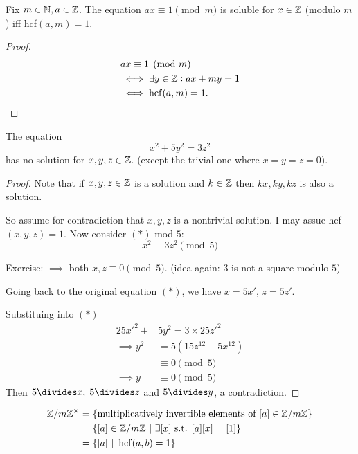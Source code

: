 \documentclass[twoside]{scrartcl}
\DeclareMathOperator{\hcf}{hcf}
\begin{document}
\begin{proposition}
Fix $m \in \mathbb{N}, a \in \mathbb{Z}$. The equation $ax \equiv 1 \pmod{m}$ is soluble for $x \in\mathbb{Z}$ (modulo $m$) iff hcf$(a,m) = 1$. 	
\end{proposition}

\begin{proof}
\[
\begin{aligned}
  &ax \equiv 1 \pmod{m}\\
  &\iff \exists y \iZ: ax +my = 1\\
  &\iff \hcf(a,m) = 1.
\end{aligned}
\]
\end{proof}\vspace*{10pt}

\begin{example}
The equation
\[x^2 + 5y^2 = 3z^2 \tag{$*$}\]	
has no solution for $x,y,z \in\mathbb{Z}$. (except the trivial one where $x = y = z = 0$).

\begin{proof}
Note that if $x,y,z \in\mathbb{Z}$ is a solution and $k\in\mathbb{Z}$ then $kx,ky, kz$ is also a solution. 

So assume for contradiction that $x,y,z$ is a nontrivial solution. I may assue hcf$(x,y,z) = 1$. Now consider $(*)$ mod $5$: 
\[x^2 \equiv 3z^2 \pmod{5}\]

Exercise: $\implies$ both $x,z \equiv 0 \pmod{5}$. (idea again: $3$ is not a square modulo $5$)

Going back to the original equation $(*)$, we have $x = 5x'$, $z = 5z'$. 

Substituing into $(*)$
\[
\begin{aligned}
  25x'^2 +& 5y^2 = 3\times 25 z'^2\\
  \implies y^2 &= 5 (15 z^{12} - 5x^{12})\\
  &\equiv 0 \pmod{5}\\
  \implies y &\equiv0 \pmod{5}
\end{aligned}
\]
Then $5 \divides x,\; 5 \divides z$ and $5\divides y$, a contradiction.
\end{proof}
\end{example}\vspace*{5pt}


\begin{definition} 
\[
\begin{aligned}
  \Z / m\Z^\times &= \{\text{multiplicatively invertible elements of } [a] \in \Z / m \Z\}\\
  &= \{[a] \in \Z / m \Z ~|~ \exists [x] \text{ s.t. } [a][x] = [1]\}\\
  &= \{[a] ~|~ \hcf(a,b) = 1\}
\end{aligned}
\]
\end{definition}
\end{document}
